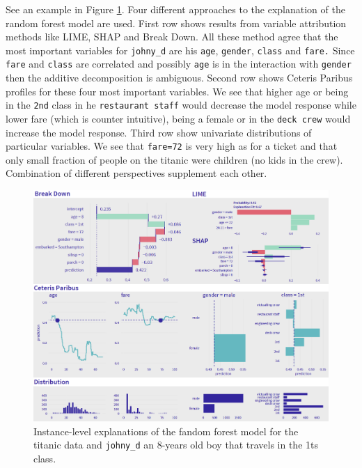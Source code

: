 \documentclass[]{krantz}
\begin{document}
See an example in Figure \ref{fig:instanceLevelExplainers}. Four different approaches to the explanation of the random forest model are used.
First row shows results from variable attribution methods like LIME, SHAP and Break Down. All these method agree that the most important variables for \texttt{johny\_d} are his \texttt{age}, \texttt{gender}, \texttt{class} and \texttt{fare.} Since \texttt{fare} and \texttt{class} are correlated and possibly \texttt{age} is in the interaction with \texttt{gender} then the additive decomposition is ambiguous.
Second row shows Ceteris Paribus profiles for these four most important variables. We see that higher age or being in the \texttt{2nd} class in he \texttt{restaurant\ staff} would decrease the model response while lower fare (which is counter intuitive), being a female or in the \texttt{deck\ crew} would increase the model response.
Third row show univariate distributions of particular variables. We see that \texttt{fare=72} is very high as for a ticket and that only small fraction of people on the titanic were children (no kids in the crew). Combination of different perspectives supplement each other.



\begin{figure}

{\centering \includegraphics[width=1\linewidth]{figure/instance_level} 

}

\caption{Instance-level explanations of the fandom forest model for the titanic data and \texttt{johny\_d} an 8-years old boy that travels in the 1ts class.}\label{fig:instanceLevelExplainers}
\end{figure}
\end{document}

